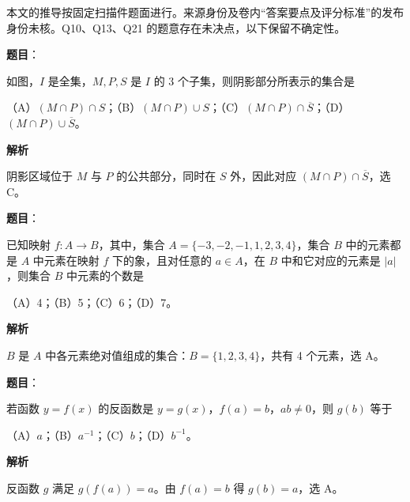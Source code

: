 

\begin{gktip}
本文的推导按固定扫描件题面进行。来源身份及卷内“答案要点及评分标准”的发布身份未核。Q10、Q13、Q21 的题意存在未决点，以下保留不确定性。
\end{gktip}

\begin{answer}

\textbf{题目}：

如图，$I$ 是全集，$M,P,S$ 是 $I$ 的 3 个子集，则阴影部分所表示的集合是

（A）$(M\cap P)\cap S$；（B）$(M\cap P)\cup S$；（C）$(M\cap P)\cap\overline S$；（D）$(M\cap P)\cup\overline S$。
\nopagebreak[4]
\begin{center}\end{center}
\nopagebreak[4]
\textbf{解析}

阴影区域位于 $M$ 与 $P$ 的公共部分，同时在 $S$ 外，因此对应 $(M\cap P)\cap\overline S$，选 C。


\end{answer}
\begin{answer}

\textbf{题目}：

已知映射 $f:A\to B$，其中，集合 $A=\{-3,-2,-1,1,2,3,4\}$，集合 $B$ 中的元素都是 $A$ 中元素在映射 $f$ 下的象，且对任意的 $a\in A$，在 $B$ 中和它对应的元素是 $|a|$，则集合 $B$ 中元素的个数是

（A）4；（B）5；（C）6；（D）7。

\textbf{解析}

$B$ 是 $A$ 中各元素绝对值组成的集合：$B=\{1,2,3,4\}$，共有 4 个元素，选 A。


\end{answer}
\begin{answer}

\textbf{题目}：

若函数 $y=f(x)$ 的反函数是 $y=g(x)$，$f(a)=b$，$ab\ne0$，则 $g(b)$ 等于

（A）$a$；（B）$a^{-1}$；（C）$b$；（D）$b^{-1}$。

\textbf{解析}

反函数 $g$ 满足 $g(f(a))=a$。由 $f(a)=b$ 得 $g(b)=a$，选 A。


\end{answer}
